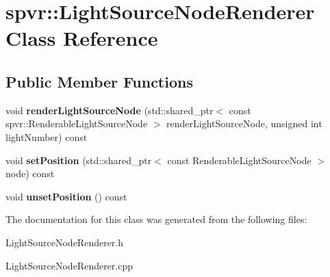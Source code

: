 \hypertarget{classspvr_1_1_light_source_node_renderer}{\section{spvr\-:\-:Light\-Source\-Node\-Renderer Class Reference}
\label{classspvr_1_1_light_source_node_renderer}
}
\subsection*{Public Member Functions}
\begin{DoxyCompactItemize}
\item 
\hypertarget{classspvr_1_1_light_source_node_renderer_ad6ff325acfa257c551d465c73c9d76d0}{void {\bfseries render\-Light\-Source\-Node} (std\-::shared\-\_\-ptr$<$ const spvr\-::\-Renderable\-Light\-Source\-Node $>$ render\-Light\-Source\-Node, unsigned int light\-Number) const }\label{classspvr_1_1_light_source_node_renderer_ad6ff325acfa257c551d465c73c9d76d0}

\item 
\hypertarget{classspvr_1_1_light_source_node_renderer_a11eb87d0ce638024751ecccfd252c70d}{void {\bfseries set\-Position} (std\-::shared\-\_\-ptr$<$ const Renderable\-Light\-Source\-Node $>$ node) const }\label{classspvr_1_1_light_source_node_renderer_a11eb87d0ce638024751ecccfd252c70d}

\item 
\hypertarget{classspvr_1_1_light_source_node_renderer_ab428c33e445c9cce2bc083c817bb90a6}{void {\bfseries unset\-Position} () const }\label{classspvr_1_1_light_source_node_renderer_ab428c33e445c9cce2bc083c817bb90a6}

\end{DoxyCompactItemize}


The documentation for this class was generated from the following files\-:\begin{DoxyCompactItemize}
\item 
Light\-Source\-Node\-Renderer.\-h\item 
Light\-Source\-Node\-Renderer.\-cpp\end{DoxyCompactItemize}
